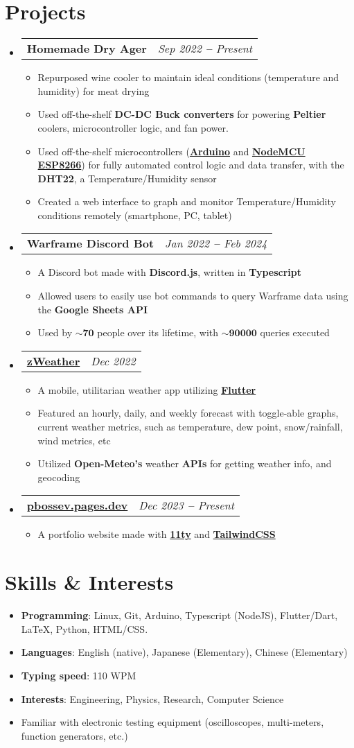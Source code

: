 \documentclass[letterpaper,9pt]{article}
\makeatletter
\newcommand{\cvSubItem}[1]{
  \item\small{
    {#1 \vspace{-2pt}}
  }
}
\newcommand{\cvTwo}[2]{
  \vspace{-2pt}\item
    \begin{tabular*}{1\textwidth}[t]{l@{\extracolsep{\fill}}r}
      \textbf{#1} & \textit{\small #2} \\
    \end{tabular*}\vspace{-5pt}
}
\newcommand{\cvItem}[1]{
  \item{
    #1
  }
  \vspace{-5pt}
}
\newcommand{\cvBodyStart}{\begin{itemize}[leftmargin=0.15in, label={}]}
\newcommand{\cvBodyEnd}{\end{itemize}}
\newcommand{\cvListStart}{\begin{itemize}}
\newcommand{\cvListEnd}{\end{itemize}\vspace{-5pt}}
\newcommand{\cvRegListStart}{\begin{itemize}[leftmargin=0.22in, label={}]}
\newcommand{\cvRegListEnd}{\end{itemize}}
\makeatother
\begin{document}
\section{Projects}
\cvBodyStart
    \cvTwo{Homemade Dry Ager}{Sep 2022 \textbf{--} Present}
    \cvListStart
        \cvSubItem{Repurposed wine cooler to maintain ideal conditions (temperature and humidity) for meat drying}
        \cvSubItem{Used off-the-shelf \textbf{DC-DC Buck converters} for powering \textbf{Peltier} coolers, microcontroller logic, and fan power.}
        \cvSubItem{Used off-the-shelf microcontrollers (\textbf{\href{https://www.arduino.cc/}{Arduino}} and \textbf{\href{https://en.wikipedia.org/wiki/NodeMCU}{NodeMCU ESP8266}}) for fully automated control logic and data transfer, with the \textbf{DHT22}, a Temperature/Humidity sensor}
        \cvSubItem{Created a web interface to graph and monitor Temperature/Humidity conditions remotely (smartphone, PC, tablet)}
    \cvListEnd
    \cvTwo{Warframe Discord Bot}{Jan 2022 \textbf{--} Feb 2024}
    \cvListStart
        \cvSubItem{A Discord bot made with \textbf{Discord.js}, written in \textbf{Typescript}}
        \cvSubItem{Allowed users to easily use bot commands to query Warframe data using the \textbf{Google Sheets API}}
        \cvSubItem{Used by $\mathbf{\sim70}$ people over its lifetime, with $\mathbf{\sim90000}$ queries executed}
    \cvListEnd
    \cvTwo{\href{https://pbossev.pages.dev/projects/zweather/}{zWeather}}{Dec 2022}
    \cvListStart
        \cvSubItem{A mobile, utilitarian weather app utilizing \textbf{\href{https://flutter.dev/}{Flutter}}}
        \cvSubItem{Featured an hourly, daily, and weekly forecast with toggle-able graphs, current weather metrics, such as temperature, dew point, snow/rainfall, wind metrics, etc}
        \cvSubItem{Utilized \textbf{Open-Meteo's} weather \textbf{APIs} for getting weather info, and geocoding}
    \cvListEnd
    \cvTwo{\href{https://pbossev.pages.dev/}{pbossev.pages.dev}}{Dec 2023 \textbf{--} Present}
    \cvListStart
        \cvSubItem{A portfolio website made with \textbf{\href{https://www.11ty.dev/}{11ty}} and \textbf{\href{https://tailwindcss.com/}{TailwindCSS}}}
    \cvListEnd
\cvBodyEnd

\section{Skills \& Interests}
\cvRegListStart
    \cvItem{\textbf{Programming}: Linux, Git, Arduino, Typescript (NodeJS), Flutter/Dart, LaTeX, Python, HTML/CSS. }
    \cvItem{\textbf{Languages}: English (native), Japanese (Elementary), Chinese (Elementary)}
    \cvItem{\textbf{Typing speed}: 110 WPM}
    \cvItem{\textbf{Interests}: Engineering, Physics, Research, Computer Science}
    \cvItem{Familiar with electronic testing equipment (oscilloscopes, multi-meters, function generators, etc.)}
\cvRegListEnd
\end{document}
